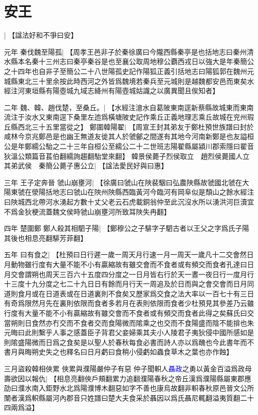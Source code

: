 \section{安王}|{
	【諡法好和不爭曰安】
	}
\par 元年
秦伐魏至陽孤|{
	【周孝王邑非子於秦徐廣曰今隴西縣秦亭是也括地志曰秦州清水縣本名秦十三州志曰秦亭秦谷是也至襄公取周地穆公覇西戎日以強大是年秦簡公之十四年也自非子至簡公二十八世陽孤史記作陽狐正義引括地志曰陽狐郭在魏州元城縣東北三十里余按此時西河之外皆爲魏境若秦兵至元城則是越魏都安邑而東矣水經注河東垣縣有陽壺城九域志絳州有陽壺城姑識之以廣異聞且俟知者】}
\par 二年
魏、韓、趙伐楚，至桑丘。|{
	【水經注澺水自葛陂東南逕新蔡縣故城東而東南流注于汝水又東南逕下桑里左迆爲橫塘陂史記作乘丘正義地理志乘丘故城在兖州瑕丘縣西北三十五里當從之】}
鄭圍韓陽翟|{
	【周宣王封其弟友于鄭杜預世族譜曰封於咸林今京兆鄭邑是也幽王無道友徙其人於虢鄶之間遂有其地今河南新鄭是也友謚桓公是年鄭繻公駘之二十三年自桓公至繻公二十二世班志陽翟縣屬潁川郡索隱曰翟音狄溫公類篇音萇伯翻繻詢趨翻駘堂來翻】}
韓景侯薨子烈侯取立　趙烈侯薨國人立其弟武侯　秦簡公薨子惠公立|{
	【諡法愛民好與曰惠】}
\par 三年
王子定奔晉
虢山崩壅河|{
	【徐廣曰虢山在陜裴駰曰弘農陜縣故虢國北虢在大陽東虢在滎陽括地志曰虢山在陜州陜縣西臨黃河今臨河有岡阜似是頹山之餘水經注曰陜城西北帶河水湧起方數十丈父老云石虎載銅翁仲至此沉沒水所以湧洪河巨瀆宜不爲金狄梗流蓋魏文侯時虢山崩壅河所致耳陜失冉翻】}
\par 四年
楚圍鄭
鄭人殺其相駟子陽|{
	【鄭穆公之子騑字子駟古者以王父之字爲氏子陽其後也相息亮翻騑芳菲翻】}
\par 五年
曰有食之|{
	【杜預曰日行遲一歲一周天月行速一月一周天一歲凡十二交會然日月動物雖行度有大量不能不小有贏縮故有雖交會而不食者或有頻交而食者孔達曰日月交會謂朔也周天三百六十五度四分度之一日月皆右行於天一晝一夜日行一度月行十三度十九分度之七二十九日日有餘而月行天一周追及於日而與之會交會而日月同道則食月或在日道表或在日道裏則不食矣又歷家爲交食之法大率以一百七十有三日有奇爲限然月先在裏則依限而食者多若月在表則依限而食者少杜預見其參差乃云雖行度有大量不能不小有贏縮故有雖交會而不食者或有頻交而食者此得之矣蘇氏曰交當朔則日食然亦冇交而不食者交而食陽微而隂乘之也交而不食陽盛而陰不能揜也朱元晦曰此則繫乎人事之感蓋臣子背君父妾婦乘其夫小人陵君子夷狄侵中國所感如是則隂盛陽微而日爲之食矣是以聖人於春秋每食必書而詩人亦以爲醜也今此書年而不書月與晦朔史失之也釋名曰日月虧曰食稍小侵虧如蟲食草木之葉也亦作蝕】
	}
\par
三月盜殺韓相俠累
俠累與濮陽嚴仲子有惡
仲子聞軹人\textcolor{blue}{聶政}之勇以黃金百溢爲政母壽欲因以報仇|{
	【相息亮翻俠戶頰翻累力追翻濮陽春秋之帝丘漢爲濮陽縣屬東郡應劭曰濮水南入鉅野水北爲陽濮博木翻惡如字不善也康烏故翻非軹春秋原邑晉文公所闈者漢爲軹縣屬河內郡音只姓譜曰楚大夫食采於聶因以爲氏聶尼輒翻溢夷質翻二十四兩爲溢】
	}
